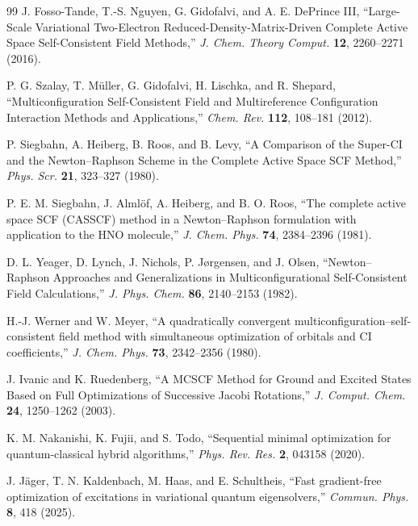 \documentclass[
 reprint,
 amsmath,amssymb,
 aps,
 physrev,
]{revtex4-2}
\begin{document}
\begin{thebibliography}{99}
    J. Fosso-Tande, T.-S. Nguyen, G. Gidofalvi, and A. E. DePrince III,
    ``Large-Scale Variational Two-Electron Reduced-Density-Matrix-Driven Complete Active Space Self-Consistent Field Methods,''
    \textit{J. Chem. Theory Comput.} \textbf{12}, 2260--2271 (2016).

    P. G. Szalay, T. M{\"u}ller, G. Gidofalvi, H. Lischka, and R. Shepard,
    ``Multiconfiguration Self-Consistent Field and Multireference Configuration Interaction Methods and Applications,''
    \textit{Chem. Rev.} \textbf{112}, 108--181 (2012).

    P. Siegbahn, A. Heiberg, B. Roos, and B. Levy,
    ``A Comparison of the Super-CI and the Newton--Raphson Scheme in the Complete Active Space SCF Method,''
    \textit{Phys. Scr.} \textbf{21}, 323--327 (1980).

    P. E. M. Siegbahn, J. Alml{\"o}f, A. Heiberg, and B. O. Roos,
    ``The complete active space SCF (CASSCF) method in a Newton--Raphson formulation with application to the HNO molecule,''
    \textit{J. Chem. Phys.} \textbf{74}, 2384--2396 (1981).

    D. L. Yeager, D. Lynch, J. Nichols, P. J{\o}rgensen, and J. Olsen,
    ``Newton--Raphson Approaches and Generalizations in Multiconfigurational Self-Consistent Field Calculations,''
    \textit{J. Phys. Chem.} \textbf{86}, 2140--2153 (1982).

    H.-J. Werner and W. Meyer,
    ``A quadratically convergent multiconfiguration--self-consistent field method with simultaneous optimization of orbitals and CI coefficients,''
    \textit{J. Chem. Phys.} \textbf{73}, 2342--2356 (1980).

    J. Ivanic and K. Ruedenberg,
    ``A MCSCF Method for Ground and Excited States Based on Full Optimizations of Successive Jacobi Rotations,''
    \textit{J. Comput. Chem.} \textbf{24}, 1250--1262 (2003).

    K. M. Nakanishi, K. Fujii, and S. Todo, ``Sequential minimal optimization for quantum-classical hybrid algorithms,'' \textit{Phys. Rev. Res.} \textbf{2}, 043158 (2020).

    J. J{\"a}ger, T. N. Kaldenbach, M. Haas, and E. Schultheis, ``Fast gradient-free optimization of excitations in variational quantum eigensolvers,'' \textit{Commun. Phys.} \textbf{8}, 418 (2025).


\end{thebibliography}
\end{document}
